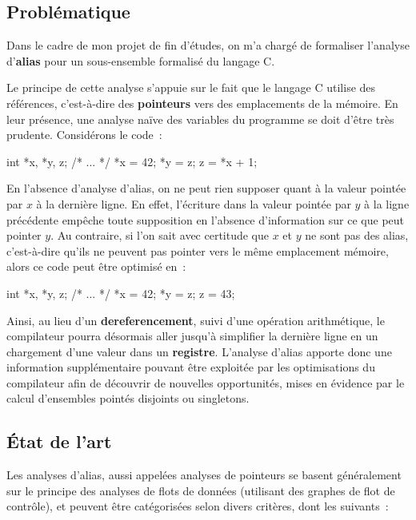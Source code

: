 \documentclass{article}
\begin{document}
\subsection{Problématique}

Dans le cadre de mon projet de fin d'études, on m'a chargé de formaliser
l'analyse d'{\bf \gls{alias}} pour un sous-ensemble formalisé du langage C.

Le principe de cette analyse s'appuie sur le fait que le langage C utilise des
références, c'est-à-dire des {\bf \glspl{pointeur}} vers des emplacements de la
mémoire. En leur présence, une analyse naïve des variables du programme se doit
d'être très prudente. Considérons le code~:

\begin{cc}
int *x, *y, z;
/* ... */
*x = 42;
*y = z;
z = *x + 1;
\end{cc}

En l'absence d'analyse d'alias, on ne peut rien supposer quant à la valeur
pointée par $x$ à la dernière ligne. En effet, l'écriture dans la
valeur pointée par $y$ à la ligne précédente empêche toute supposition
en l'absence d'information sur ce que peut pointer $y$. Au contraire,
si l'on sait avec certitude que $x$ et $y$ ne sont pas des
alias, c'est-à-dire qu'ils ne peuvent pas pointer vers le même emplacement
mémoire, alors ce code peut être optimisé en~:

\begin{cc}
int *x, *y, z;
/* ... */
*x = 42;
*y = z;
z = 43;
\end{cc}

Ainsi, au lieu d'un {\bf \gls{dereferencement}}, suivi d'une opération
arithmétique, le compilateur pourra désormais aller jusqu'à simplifier la
dernière ligne en un chargement d'une valeur dans un {\bf \gls{registre}}.
L'analyse d'alias apporte donc une information supplémentaire pouvant être
exploitée par les optimisations du compilateur afin de découvrir de nouvelles
opportunités, mises en évidence par le calcul d'ensembles pointés disjoints ou
singletons.

\subsection{État de l'art}

Les analyses d'alias, aussi appelées analyses de pointeurs se basent
généralement sur le principe des analyses de flots de données (utilisant des
graphes de flot de contrôle), et peuvent être catégorisées selon divers
critères, dont les suivants~:
\end{document}
